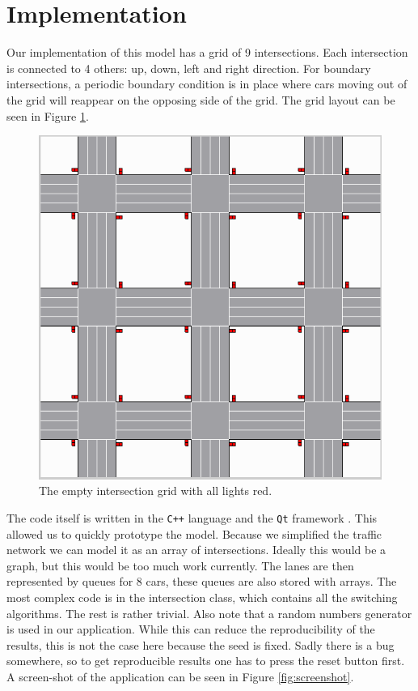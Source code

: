 \documentclass[a4paper,11pt]{article}
\begin{document}
\section{Implementation}\label{sec:implementation}

Our implementation of this model has a grid of 9 intersections.
Each intersection is connected to 4 others: up, down, left and right direction.
For boundary intersections, a periodic boundary condition is in place where
cars moving out of the grid will reappear on the opposing side of the grid.
The grid layout can be seen in Figure \ref{fig:intersections}.

\begin{figure}[H]
  \centering
  \includegraphics[width=.8\linewidth]{img/intersections.png}
  \caption{The empty intersection grid with all lights red.}
  \label{fig:intersections}
\end{figure}

\noindent The code itself is written in the \verb|C++| language \cite{cpp} and the \verb|Qt| framework \cite{qt}.
This allowed us to quickly prototype the model.
Because we simplified the traffic network we can model it as an array of intersections.
Ideally this would be a graph, but this would be too much work currently.
The lanes are then represented by queues for 8 cars, these queues are also stored with arrays.
The most complex code is in the intersection class, which contains all the switching algorithms.
The rest is rather trivial.
Also note that a random numbers generator is used in our application.
While this can reduce the reproducibility of the results, this is not the case here because the seed is fixed.
Sadly there is a bug somewhere, so to get reproducible results one has to press the reset button first.
A screen-shot of the application can be seen in Figure \ref{fig:screenshot}.
\end{document}
